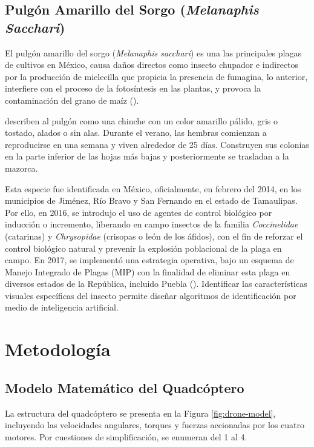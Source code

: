 \documentclass[11pt]{exam}
\begin{document}
        \subsection{Pulg\'on Amarillo del Sorgo (\textit{Melanaphis Sacchari})}\label{sec2.4}
        El pulg\'on amarillo del sorgo (\textit{Melanaphis sacchari}) es una las principales plagas de cultivos en M\'exico, causa daños directos como insecto chupador e indirectos por la producci\'on de mielecilla que propicia la presencia de fumagina, lo anterior, interfiere con el proceso de la fotos\'intesis en las plantas, y provoca la contaminaci\'on del grano de ma\'iz (\cite{pecina-2021}). 

        \cite{hakeem-2019} describen al pulg\'on como una chinche con un color amarillo p\'alido, gris o tostado, alados o sin alas. Durante el verano, las hembras comienzan a reproducirse en una semana y viven alrededor de 25 d\'ias. Construyen sus colonias en la parte inferior de las hojas más bajas y posteriormente se trasladan a la mazorca. 

        Esta especie fue identificada en M\'exico, oficialmente, en febrero del 2014, en los municipios de Jim\'enez, R\'io Bravo y San Fernando en el estado de Tamaulipas. Por ello, en 2016, se introdujo el uso de agentes de control biol\'ogico por inducci\'on o incremento, liberando en campo insectos de la familia \textit{Coccinelidae} (catarinas) y \textit{Chrysopidae} (crisopas o le\'on de los \'afidos), con el fin de reforzar el control biol\'ogico natural y prevenir la explosi\'on poblacional de la plaga en campo. En 2017, se implement\'o una estrategia operativa, bajo un esquema de Manejo Integrado de Plagas (MIP) con la finalidad de eliminar esta plaga en diversos estados de la República, incluido Puebla (\cite{senasica-2018}). Identificar las características visuales específicas del insecto permite diseñar algoritmos de identificación por medio de inteligencia artificial.

    \section{Metodolog\'ia}\label{sec3}
        \subsection{Modelo Matem\'atico del Quadc\'optero}\label{sec3.1}
        La estructura del quadc\'optero se presenta en la Figura \ref{fig:drone-model}, incluyendo las velocidades angulares, torques y fuerzas accionadas por los cuatro motores. Por cuestiones de simplificaci\'on, se enumeran del 1 al 4.
\end{document}

